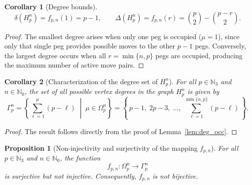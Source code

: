 \documentclass[letterpaper,12pt]{article}
\newtheorem{proposition}{Proposition}
\newtheorem{corollary}{Corollary}
\begin{document}
\begin{corollary}[Degree bounds]
\[
\delta(H_p^n)=f_{p,n}(1)=p-1, \qquad
\Delta(H_p^n)=f_{p,n}(r)=\binom{p}{2}-\binom{p-r}{2}.
\]
\end{corollary}

\begin{proof}
The smallest degree arises when only one peg is occupied (\(\mu=1\)), since only that single peg provides possible moves to the other \(p-1\) pegs.  
Conversely, the largest degree occurs when all \(r=\min\{n,p\}\) pegs are occupied, producing the maximum number of active move pairs.\qedhere
\end{proof}



\begin{corollary}[Characterization of the degree set of $H_p^n$]\label{lemma:degree-set}
For all $p \in \mathbb{N}_3$ and $n \in \mathbb{N}_0$, the set of all possible vertex degrees in the graph $H_p^n$ is given by
\begin{equation}
    \Gamma_p^n 
    = \left\{ \sum_{\ell = 1}^{\mu} (p - \ell) \;\middle|\; \mu \in \Omega_p^n \right\}
    = \left\{\, p - 1,\; 2p - 3,\; \ldots,\; \sum_{\ell = 1}^{\min\{n, p\}} (p - \ell) \,\right\}.
\end{equation}
\end{corollary}

\begin{proof}
The result follows directly from the proof of Lemma~\ref{lem:deg_occ}.\qedhere
\end{proof}

\begin{proposition}[Non-injectivity and surjectivity of the mapping $f_{p,n}$]\label{prop:deg-noninj}
For all $p \in \mathbb{N}_3$ and $n \in \mathbb{N}_0$, the function 
\[
f_{p,n} : \Omega_p^n \longrightarrow \Gamma_p^n
\]
is surjective but not injective. Consequently, $f_{p,n}$ is not bijective.
\end{proposition}
\end{document}
